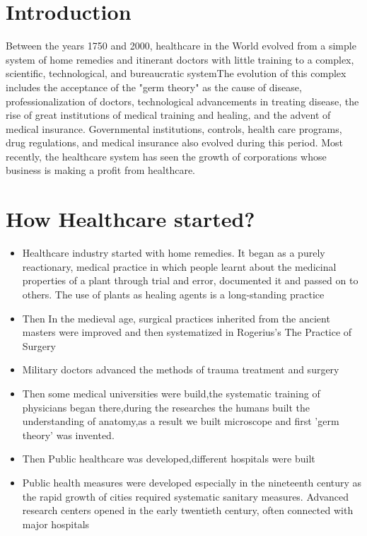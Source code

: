 \documentclass[12pt]{article}
\begin{document}
\section{Introduction}


Between the years 1750 and 2000, healthcare in the World evolved from a simple system of home remedies and itinerant doctors with little training to a complex, scientific, technological, and bureaucratic systemThe evolution of this complex includes the acceptance of the "germ theory" as the cause of disease, professionalization of doctors, technological advancements in treating disease, the rise of great institutions of medical training and healing, and the advent of medical insurance. Governmental institutions, controls, health care programs, drug regulations, and medical insurance also evolved during this period. Most recently, the healthcare system has seen the growth of corporations whose business is making a profit from healthcare.

\section{How Healthcare started?}
\begin{itemize}


\item Healthcare industry started with home remedies. It began as a purely reactionary, medical practice in which people learnt about the medicinal properties of a plant through trial and error, documented it and passed on to others. The use of plants as healing agents is a long-standing practice 

\item Then In the medieval age, surgical practices inherited from the ancient masters were improved and then systematized in Rogerius’s The Practice of Surgery

\item Military doctors advanced the methods of trauma treatment and surgery

\item Then some medical universities were build,the systematic training of physicians began there,during the researches the humans built the understanding of anatomy,as a result we built microscope and first 'germ theory' was invented.



\item Then Public healthcare was developed,different hospitals were built

\item Public health measures were developed especially in the nineteenth century as the rapid growth of cities required systematic sanitary measures. Advanced research centers opened in the early twentieth century, often connected with major hospitals





\end{itemize}
\end{document}
